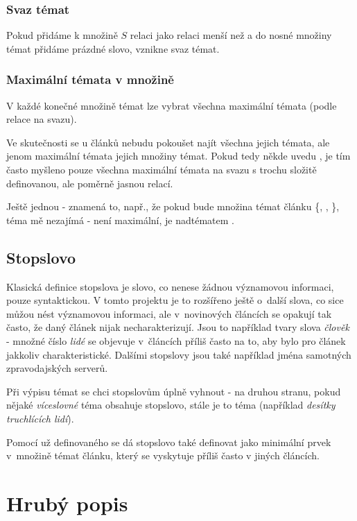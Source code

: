 \documentclass[12pt]{amsart}
\begin{document}
\subsubsection{Svaz témat}
\label{svaztemat}
Pokud přidáme k množině $S$ relaci  jako relaci menší než a do nosné množiny témat přidáme prázdné slovo, vznikne svaz témat. 

\subsubsection{Maximální témata v množině}
V každé konečné množině témat lze vybrat všechna maximální témata (podle relace na svazu). 

Ve skutečnosti se u článků nebudu pokoušet najít všechna jejich témata, ale jenom maximální témata jejich množiny témat. Pokud tedy někde uvedu , je tím často myšleno pouze všechna maximální témata na svazu 
s trochu složitě definovanou, ale poměrně jasnou relací. 


Ještě jednou - znamená to, např., že pokud bude množina témat článku \{, , \}, téma  mě nezajímá - není maximální, je nadtématem .


\subsection{Stopslovo}
\label{stopslovo}
Klasická definice stopslova je slovo, co nenese žádnou vý\-zna\-mo\-vou informaci, pouze syntaktickou. V tomto projektu je to rozšířeno ještě o~další slova, co sice můžou nést významovou informaci, ale v~novinových článcích se opakují tak čas\-to, že daný článek nijak necharakterizují. Jsou to například tvary slova \emph{člověk} - množné číslo \emph{lidé} se objevuje v~článcích příliš často na to, aby bylo pro článek jakkoliv charakteristické. Dalšími stopslovy jsou také například jména samotných zpra\-vo\-daj\-ských serverů.

Při výpisu témat se chci stopslovům úplně vyhnout - na druhou stranu, pokud nějaké \emph{víceslovné} téma obsahuje stopslovo, stále je to téma (například \emph{desítky truchlících lidí}).

Pomocí už definovaného se dá stopslovo také definovat jako minimální prvek v~množině témat článku, který se vyskytuje příliš často v jiných článcích.

\section{Hrubý popis}
\end{document}
